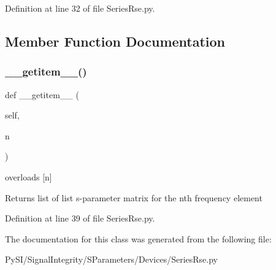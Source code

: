 Definition at line 32 of file Series\+Rse.\+py.



\subsection{Member Function Documentation}
\mbox{\label{classSignalIntegrity_1_1SParameters_1_1Devices_1_1SeriesRse_1_1SeriesRse_ab7a6da5139e0878b590d68292aaa70f2}} 
\subsubsection{\texorpdfstring{\+\_\+\+\_\+getitem\+\_\+\+\_\+()}{\_\_getitem\_\_()}}
{\footnotesize\ttfamily def \+\_\+\+\_\+getitem\+\_\+\+\_\+ (\begin{DoxyParamCaption}\item[{}]{self,  }\item[{}]{n }\end{DoxyParamCaption})}



overloads \mbox{[}n\mbox{]} 

\begin{DoxyReturn}{Returns}
list of list s-\/parameter matrix for the nth frequency element 
\end{DoxyReturn}


Definition at line 39 of file Series\+Rse.\+py.



The documentation for this class was generated from the following file\+:\begin{DoxyCompactItemize}
\item 
Py\+S\+I/\+Signal\+Integrity/\+S\+Parameters/\+Devices/Series\+Rse.\+py\end{DoxyCompactItemize}
